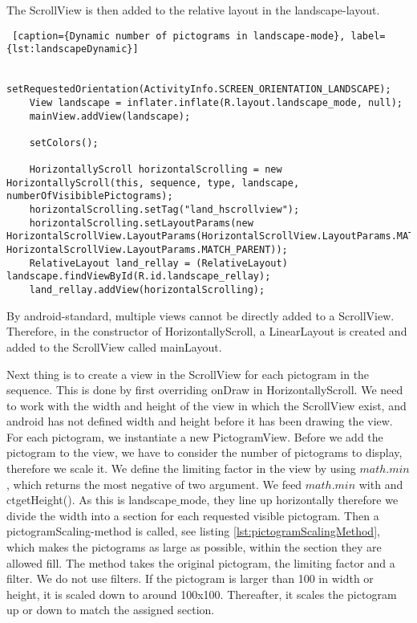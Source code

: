 The ScrollView is then added to the relative layout in the landscape-layout.

\begin{lstlisting} [caption={Dynamic number of pictograms in landscape-mode}, label={lst:landscapeDynamic}]

	setRequestedOrientation(ActivityInfo.SCREEN_ORIENTATION_LANDSCAPE);
	View landscape = inflater.inflate(R.layout.landscape_mode, null);
	mainView.addView(landscape);
	
	setColors();
	
	HorizontallyScroll horizontalScrolling = new HorizontallyScroll(this, sequence, type, landscape, numberOfVisibiblePictograms);
	horizontalScrolling.setTag("land_hscrollview");
	horizontalScrolling.setLayoutParams(new HorizontalScrollView.LayoutParams(HorizontalScrollView.LayoutParams.MATCH_PARENT, HorizontalScrollView.LayoutParams.MATCH_PARENT));
	RelativeLayout land_rellay = (RelativeLayout) landscape.findViewById(R.id.landscape_rellay);
	land_rellay.addView(horizontalScrolling);

\end{lstlisting}

By android-standard, multiple views cannot be directly added to a ScrollView. Therefore, in the constructor of HorizontallyScroll, a LinearLayout is created and added to the ScrollView called mainLayout. 

Next thing is to create a view in the ScrollView for each pictogram in the sequence. This is done by first overriding onDraw in HorizontallyScroll. We need to work with the width and height of the view in which the ScrollView exist, and android has not defined width and height before it has been drawing the view. For each pictogram, we instantiate a new PictogramView. Before we add the pictogram to the view, we have to consider the number of pictograms to display, therefore we scale it. We define the limiting factor in the view by using $math.min$, which returns the most negative of two argument. We feed $math.min$ with  and ct{getHeight()}. As this is landscape$\_$mode, they line up horizontally therefore we divide the width into a section for each requested visible pictogram. Then a pictogramScaling-method is called, see listing \ref{lst:pictogramScalingMethod}, which makes the pictograms as large as possible, within the section they are allowed fill. The method takes the original pictogram, the limiting factor and a filter. We do not use filters. If the pictogram is larger than 100 in width or height, it is scaled down to around 100x100. Thereafter, it scales the pictogram up or down to match the assigned section. 

